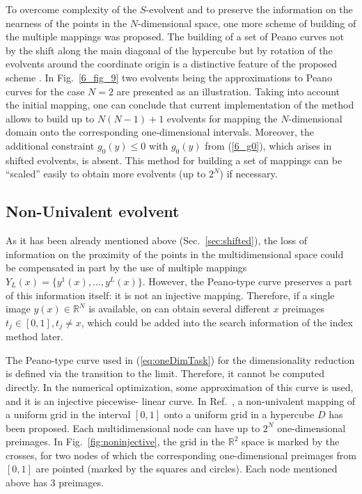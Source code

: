\documentclass[runningheads]{llncs}
\begin{document}
To overcome complexity of the $S$-evolvent and to preserve the information on the nearness of the points in
the $N$-dimensional space, one more scheme of building of the multiple mappings was proposed.
The building of a set of Peano curves not by the shift along the main diagonal of the hypercube
but by rotation of the evolvents around the coordinate origin is a distinctive feature of the
proposed scheme \cite{Gergel2009}.
In Fig.~\ref{6_fig_9} two evolvents being the approximations to Peano curves for the case
$N=2$ are presented as an illustration.
Taking into account the initial mapping, one can conclude that current implementation of the
method allows to build up to $N(N-1)+1$ evolvents for mapping the $N$-dimensional domain
onto the corresponding one-dimensional intervals. Moreover, the additional constraint  $g_0(y)
\leq 0$ with $g_0(y)$ from (\ref{6_g0}), which arises in shifted evolvents, is absent. This
method for building a set of mappings can be ``scaled'' easily to obtain more evolvents (up to
$2^N$) if necessary.


\subsection{Non-Univalent evolvent}

As it has been already mentioned above (Sec.~\ref{sec:shifted}), the loss of information on the
proximity of the points in the multidimensional space could be compensated in part by the use
of multiple mappings $Y_L(x)=\{y^1(x),...,y^L(x)\}$. However, the Peano-type curve preserves
a part of this information itself: it is not an injective mapping. Therefore, if a single image
$y(x)\in \mathbb{R}^N$ is available, on can obtain several different $x$ preimages
$t_j\in[0,1], t_j \not = x$, which could be added into the search information of the index
method later.

The Peano-type curve used in (\ref{eq:oneDimTask}) for the dimensionality reduction is
defined via the transition to the limit. Therefore, it cannot be computed directly. In the
numerical optimization, some approximation of this curve is used, and it is an injective piecewise-
linear curve. In Ref.~\cite{strongin1978}, a non-univalent mapping of a uniform grid in the
interval $[0,1]$ onto a uniform grid in a hypercube $D$ has been proposed. Each
multidimensional node can have up to $2^N$ one-dimensional preimages. In
Fig.~\ref{fig:noninjective}, the grid in the $\mathbb{R}^2$ space is marked by the crosses, for
two nodes of which the corresponding one-dimensional preimages from $[0,1]$ are pointed
(marked by the squares and circles). Each node mentioned above has 3 preimages.
\end{document}
